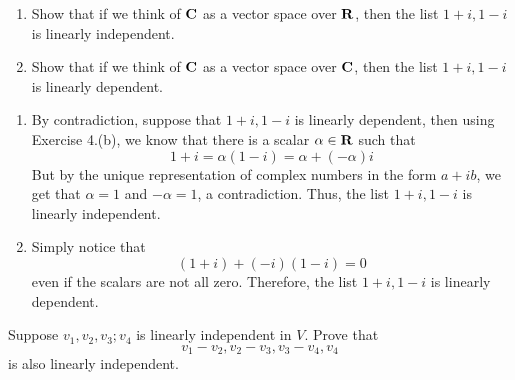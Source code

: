 \begin{exercise}
    \begin{enumerate}[label=(\alph*)]
        \item Show that if we think of $\mathbf{C}$ as a vector space over $\mathbf{R}$, then the list $1+i, 1-i$ is linearly independent.
        \item Show that if we think of $\mathbf{C}$ as a vector space over $\mathbf{C}$, then the list $1+i, 1-i$ is linearly dependent.\\
    \end{enumerate}
\end{exercise}

\begin{solution}
    \begin{enumerate}[label=(\alph*)]
        \item By contradiction, suppose that $1+i, 1-i$ is linearly dependent, then using Exercise 4.(b), we know that there is a scalar $\alpha \in \mathbf{R}$ such that
        $$1 + i = \alpha(1-i) = \alpha + (-\alpha)i$$
        But by the unique representation of complex numbers in the form $a+ib$, we get that $\alpha = 1$ and $-\alpha = 1$, a contradiction. Thus, the list $1+i, 1-i$ is linearly independent. \\
        \item Simply notice that
        $$(1+i) + (-i)(1-i) = 0$$
        even if the scalars are not all zero. Therefore, the list $1+i, 1-i$ is linearly dependent. \\
    \end{enumerate}
\end{solution}

\begin{exercise}
    Suppose $v_1,v_2,v_3; v_4$ is linearly independent in $V$. Prove that
    $$v_1 - v_2, v_2 - v_3, v_3 - v_4, v_4$$
    is also linearly independent. \\
\end{exercise}


